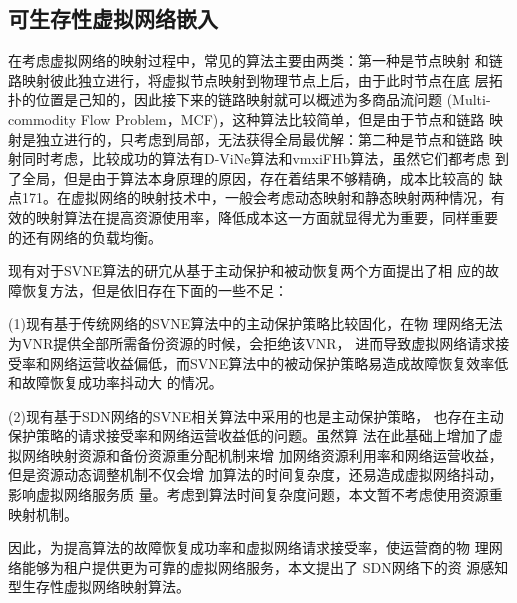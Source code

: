 \subsection{可生存性虚拟网络嵌入}
在考虑虚拟网络的映射过程中，常见的算法主要由两类：第一种是节点映射 和链路映射彼此独立进行，将虚拟节点映射到物理节点上后，由于此时节点在底 层拓扑的位置是己知的，因此接下来的链路映射就可以概述为多商品流问题 (Multi-commodity Flow Problem，MCF)，这种算法比较简单，但是由于节点和链路 映射是独立进行的，只考虑到局部，无法获得全局最优解：第二种是节点和链路 映射同时考虑，比较成功的算法有D-ViNe算法和vmxiFHb算法，虽然它们都考虑 到了全局，但是由于算法本身原理的原因，存在着结果不够精确，成本比较高的 缺点171。在虚拟网络的映射技术中，一般会考虑动态映射和静态映射两种情况，有 效的映射算法在提高资源使用率，降低成本这一方面就显得尤为重要，同样重要 的还有网络的负载均衡。

现有对于SVNE算法的研宂从基于主动保护和被动恢复两个方面提出了相 应的故障恢复方法，但是依旧存在下面的一些不足：

(1)现有基于传统网络的SVNE算法中的主动保护策略比较固化，在物 理网络无法为VNR提供全部所需备份资源的时候，会拒绝该VNR， 进而导致虚拟网络请求接受率和网络运营收益偏低，而SVNE算法中的被动保护策略易造成故障恢复效率低和故障恢复成功率抖动大 的情况。

(2)现有基于SDN网络的SVNE相关算法中采用的也是主动保护策略， 也存在主动保护策略的请求接受率和网络运营收益低的问题。虽然算 法在此基础上增加了虚拟网络映射资源和备份资源重分配机制来增 加网络资源利用率和网络运营收益，但是资源动态调整机制不仅会增 加算法的时间复杂度，还易造成虚拟网络抖动，影响虚拟网络服务质 量。考虑到算法时间复杂度问题，本文暂不考虑使用资源重映射机制。

因此，为提高算法的故障恢复成功率和虚拟网络请求接受率，使运营商的物 理网络能够为租户提供更为可靠的虚拟网络服务，本文提出了 SDN网络下的资 源感知型生存性虚拟网络映射算法。




